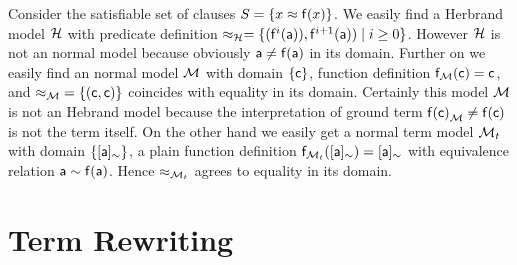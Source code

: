 \begin{example}
	Consider the satisfiable set of clauses $S = \{ x \approx {\mathsf f}(x) \}$. 
%	
	We easily find a Herbrand model ${\mathcal H}$ with
	predicate definition $\approx_{\mathcal H} = \{ ({\mathsf f}^{i}({\mathsf a})), {\mathsf f}^{i+1}({\mathsf a})) \mid i\geq 0  \} $. 
	However ${\mathcal H}$ is not an normal model because obviously ${\mathsf a}\neq{\mathsf f}({\mathsf a})$ in its domain.
%	
	Further on we easily find an normal model ${\mathcal M}$ 
	with domain $\{ {\mathsf c} \}$, function definition ${\mathsf f}_{\mathcal M}({\mathsf c}) = {\mathsf c}$, 
	and ${\approx_{\mathcal M}} = \{ ({\mathsf c},{\mathsf c})\}$ coincides with equality in its domain.
	Certainly this model ${\mathcal M}$ is not an Hebrand model 
	because the interpretation of ground term ${{\mathsf f}({\mathsf c})}_{\mathcal M} \neq {\mathsf f}({\mathsf c})$ is not the term itself.
%	
	On the other hand we easily get a normal term model ${\mathcal M}_t$ with domain $\{ [{\mathsf a}]_\sim\}$, 
	a plain function definition
	${\mathsf f}_{{\mathcal M}_t}([{\mathsf a}]_\sim) = [{\mathsf a}]_\sim$
	with equivalence relation
	${\mathsf a} \sim {\mathsf f}({\mathsf a})$.
	Hence $\approx_{{\mathcal M}_t}$ agrees to equality in its domain.	
\end{example}


\section{Term Rewriting}\label{sec:termrewriting}


